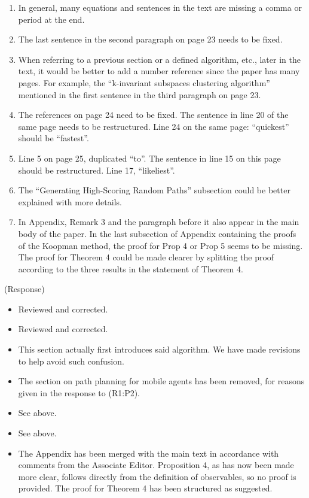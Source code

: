 \documentclass{letter}
\begin{document}
\begin{enumerate}
	\item In general, many equations and sentences in the text are missing a
	comma or period at the end.
	\item The last sentence in the second paragraph on page 23 needs to be fixed.
	\item When referring to a previous section or a defined algorithm, etc., later in the text, it would be better to add a number reference since the paper has many pages. For example, the “k-invariant subspaces clustering algorithm” mentioned in the first sentence in the third paragraph on page 23.
	\item The references on page 24 need to be fixed. The sentence in line 20 of the same page needs to be restructured. Line 24 on the same page: 	“quickest” should be “fastest”.
	\item Line 5 on page 25, duplicated “to”. The sentence in line 15 on this page should be restructured. Line 17, “likeliest”.
	\item The “Generating High-Scoring Random Paths” subsection could be better explained with more details.
	\item In Appendix, Remark 3 and the paragraph before it also appear in the main body of the paper. In the last subsection of Appendix containing the proofs of the Koopman method, the proof for Prop 4 or Prop 5 seems to be missing. The proof for Theorem 4 could be made clearer by splitting the proof according to the three results in the statement of Theorem 4.
\end{enumerate}

{\color{red}(Response)}
\begin{itemize}
	\item Reviewed and corrected.
	\item Reviewed and corrected.
	\item This section actually first introduces said algorithm. We have made revisions to help avoid such confusion.
	\item The section on path planning for mobile agents has been removed, for reasons given in the response to {\color{red}(R1:P2)}.
	\item See above.
	\item See above.
	\item The Appendix has been merged with the main text in accordance with comments from the Associate Editor. Proposition 4, as has now been made more clear, follows directly from the definition of observables, so no proof is provided. The proof for Theorem 4 has been structured as suggested.
\end{itemize}
\end{document}
